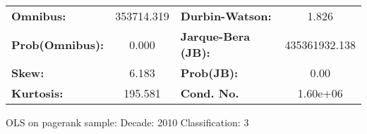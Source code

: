 \begin{center}
\begin{tabular}{lccccc}
\bottomrule
\end{tabular}
\begin{tabular}{lclc}
\textbf{Omnibus:}       & 353714.319 & \textbf{  Durbin-Watson:     } &       1.826    \\
\textbf{Prob(Omnibus):} &    0.000   & \textbf{  Jarque-Bera (JB):  } & 435361932.138  \\
\textbf{Skew:}          &    6.183   & \textbf{  Prob(JB):          } &        0.00    \\
\textbf{Kurtosis:}      &  195.581   & \textbf{  Cond. No.          } &    1.60e+06    \\
\bottomrule
\end{tabular}
\end{center}
\break
OLS on pagerank sample: Decade: 2010 Classification: 3
